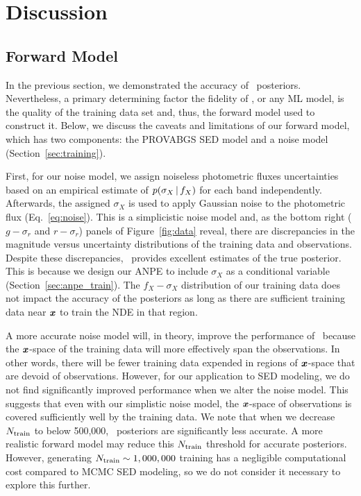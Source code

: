 \section{Discussion} \label{sec:discuss}
\subsection{Forward Model} \label{sec:forward-model}
In the previous section, we demonstrated the accuracy of \sedflow~posteriors. 
Nevertheless, a primary determining factor the fidelity of \sedflow, or any ML model, is
the quality of the training data set and, thus, the forward model used to
construct it. 
Below, we discuss the caveats and limitations of our forward model, which has
two components: the PROVABGS SED model and a noise model
(Section~\ref{sec:training}).

First, for our noise model, we assign noiseless photometric fluxes
uncertainties based on an empirical estimate of $p(\sigma_X\,|\, f_X)$ for
each band independently. 
Afterwards, the assigned $\sigma_X$ is used to apply Gaussian noise to the
photometric flux (Eq.~\ref{eq:noise}). 
This is a simplicistic noise model and, as the bottom right ($g - \sigma_r$ and
$r - \sigma_r$) panels of Figure~\ref{fig:data} reveal, there are discrepancies
in the magnitude versus uncertainty distributions of the training data and
observations. 
Despite these discrepancies, \sedflow~provides excellent estimates of the true
posterior.  
This is because we design our ANPE to include $\sigma_X$ as a conditional
variable (Section~\ref{sec:anpe_train}).
The $f_X-\sigma_X$ distribution of our training data does not impact the
accuracy of the posteriors as long as there are sufficient training data near
$\textbf{\textit{x}}$ to train the NDE in that region.

A more accurate noise model will, in theory, improve the performance of
\sedflow~because the $\textbf{\textit{x}}$-space of the training data will more effectively
span the observations. 
In other words, there will be fewer training data expended in regions of 
$\textbf{\textit{x}}$-space that are devoid of observations.  
However, for our application to SED modeling, we do not find significantly  
improved performance when we alter the noise model.
This suggests that even with our simplistic noise model, the
$\textbf{\textit{x}}$-space of observations is covered sufficiently well by the training data. 
We note that when we decrease $N_{\rm train}$ to below 500,000,
\sedflow~posteriors are significantly less accurate. 
A more realistic forward model may reduce this $N_{\rm train}$ threshold for
accurate posteriors. 
However, generating $N_{\rm train} \sim 1,000,000$ training has a negligible
computational cost compared to MCMC SED modeling, so we do not consider it 
necessary to explore this further. 

